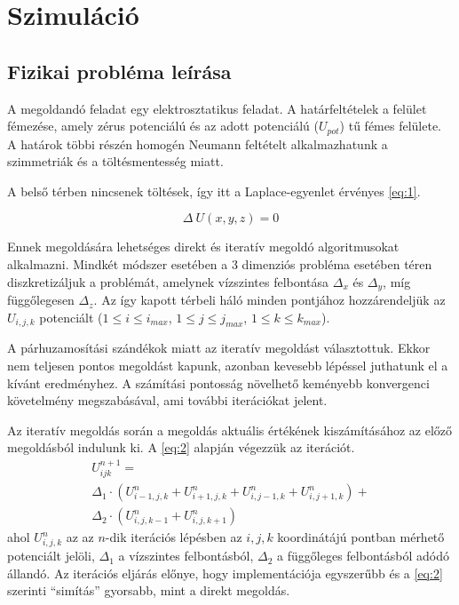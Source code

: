 	\section{Szimuláció} 
	
	\subsection{Fizikai probléma leírása} 
	
	A megoldandó feladat egy elektrosztatikus feladat.
	A  határfeltételek a felület fémezése, amely zérus potenciálú és az adott
	potenciálú ($U_{pot}$) tű fémes felülete.
	A határok többi részén homogén Neumann feltételt alkalmazhatunk a szimmetriák és a töltésmentesség miatt.
	
	A belső térben nincsenek töltések, így itt a Laplace-egyenlet érvényes
	\eqref{eq:1}.
	
	\begin{equation}\label{eq:1}
		\Delta \ U(x,y,z) = 0 
	\end{equation}
	
	Ennek megoldására lehetséges direkt és iteratív megoldó algoritmusokat alkalmazni.
	Mindkét módszer esetében a 3 dimenziós probléma esetében téren diszkretizáljuk a problémát,
	amelynek vízszintes felbontása $\Delta_x$ és $\Delta_y$, míg függőlegesen $\Delta_z$.
	Az így kapott térbeli háló minden pontjához hozzárendeljük az $U_{i,j,k}$ potenciált
	 ($1\leq i\leq i_{max}$, $1\leq j\leq j_{max}$, $1\leq k\leq k_{max}$). 
	
	A párhuzamosítási szándékok miatt az iteratív megoldást választottuk.
	Ekkor nem teljesen pontos megoldást kapunk, azonban kevesebb lépéssel
	juthatunk el a kívánt eredményhez.
	A számítási pontosság növelhető keményebb konvergenci követelmény
	megszabásával, ami további iterációkat jelent.
	
	Az iteratív megoldás során a megoldás aktuális értékének kiszámításához az
	előző megoldásból indulunk ki.
	A \eqref{eq:2} alapján végezzük az iterációt.
		\begin{multline} \label{eq:2} 
			U_{ijk}^{n+1} = \\ \Delta_1 \cdot \left(U_{i-1,j,k}^n+U_{i+1,j,k}^n
			+U_{i,j-1,k}^n+U_{i,j+1,k}^n\right)+ \\
							\Delta_2 \cdot \left(U_{i,j,k-1}^n+U_{i,j,k+1}^n\right)
		\end{multline}
	ahol $U_{i,j,k}^n$ az az $n$-dik iterációs lépésben az $i,j,k$ koordinátájú
	pontban mérhető potenciált jelöli, $\Delta_1$ a vízszintes felbontásból,
	$\Delta_2$ a függőleges felbontásból adódó állandó.
	Az iterációs eljárás előnye, hogy implementációja egyszerűbb és a
	\eqref{eq:2} szerinti ``simítás'' gyorsabb, mint a direkt megoldás.
	
